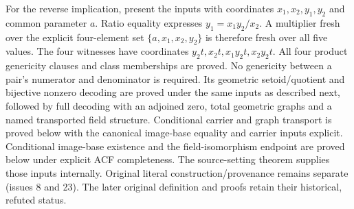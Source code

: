 \documentclass[11pt,oneside]{article}
\theoremstyle{definition}
\theoremstyle{remark}
\begin{document}
For the reverse implication, present the inputs with coordinates $x_1,x_2,y_1,y_2$
and common parameter $a$. Ratio equality expresses $y_1=x_1y_2/x_2$. A multiplier
fresh over the explicit four-element set $\{a,x_1,x_2,y_2\}$ is therefore fresh
over all five values. The four witnesses have coordinates
$y_2t,x_2t,x_1y_2t,x_2y_2t$. All four product genericity clauses and class
memberships are proved. No genericity between a pair's numerator and denominator
is required. Its geometric setoid/quotient and bijective nonzero decoding are proved
under the same inputs as described next, followed by full decoding with an adjoined zero,
total geometric graphs and a named transported field structure. Conditional carrier
and graph transport is proved below with the canonical image-base equality and carrier
inputs explicit. Conditional image-base existence and the field-isomorphism endpoint are proved
below under explicit ACF completeness. The source-setting theorem supplies those
inputs internally. Original literal construction/provenance remains separate (issues 8 and 23).
The later original definition and proofs retain their
historical, refuted status.
\end{document}

